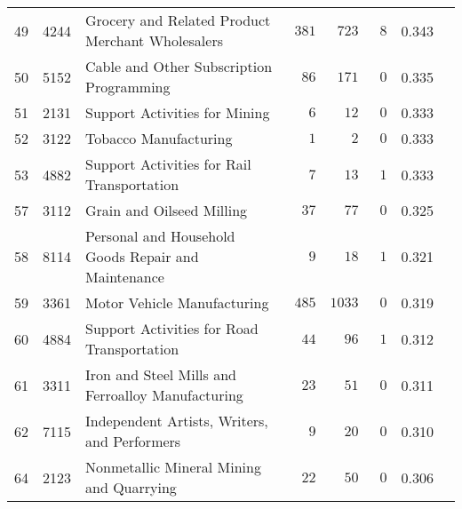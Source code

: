\documentclass[9pt, oneside]{article}   	%
\begin{document}
\begin{longtable}{lcp{3 in}ccccc}
49  & 4244 & Grocery and Related Product Merchant Wholesalers & $\phantom{0}381$ & $\phantom{0}723$ & $\phantom{0}8$ & 0.343 \\
50  & 5152 & Cable and Other Subscription Programming & $\phantom{00}86$ & $\phantom{0}171$ & $\phantom{0}0$ & 0.335 \\
51  & 2131 & Support Activities for Mining & $\phantom{000}6$ & $\phantom{00}12$ & $\phantom{0}0$ & 0.333 \\
52  & 3122 & Tobacco Manufacturing & $\phantom{000}1$ & $\phantom{000}2$ & $\phantom{0}0$ & 0.333 \\
53  & 4882 & Support Activities for Rail Transportation & $\phantom{000}7$ & $\phantom{00}13$ & $\phantom{0}1$ & 0.333 \\

57  & 3112 & Grain and Oilseed Milling & $\phantom{00}37$ & $\phantom{00}77$ & $\phantom{0}0$ & 0.325 \\
58  & 8114 & Personal and Household Goods Repair and Maintenance & $\phantom{000}9$ & $\phantom{00}18$ & $\phantom{0}1$ & 0.321 \\
59  & 3361 & Motor Vehicle Manufacturing & $\phantom{0}485$ & $1033$ & $\phantom{0}0$ & 0.319 \\
60  & 4884 & Support Activities for Road Transportation & $\phantom{00}44$ & $\phantom{00}96$ & $\phantom{0}1$ & 0.312 \\
61  & 3311 & Iron and Steel Mills and Ferroalloy Manufacturing & $\phantom{00}23$ & $\phantom{00}51$ & $\phantom{0}0$ & 0.311 \\
62  & 7115 & Independent Artists, Writers, and Performers & $\phantom{000}9$ & $\phantom{00}20$ & $\phantom{0}0$ & 0.310 \\

64  & 2123 & Nonmetallic Mineral Mining and Quarrying & $\phantom{00}22$ & $\phantom{00}50$ & $\phantom{0}0$ & 0.306 \\


\end{longtable}
\end{document}
